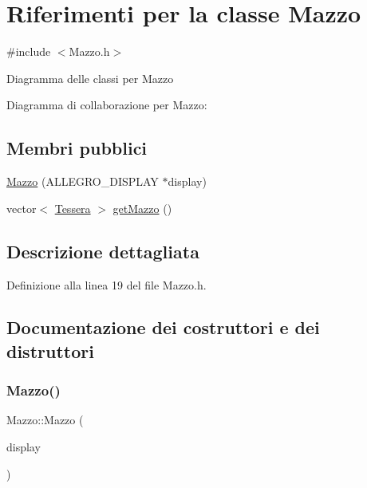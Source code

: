 \hypertarget{class_mazzo}{}\section{Riferimenti per la classe Mazzo}
\label{class_mazzo}


{\ttfamily \#include $<$Mazzo.\+h$>$}



Diagramma delle classi per Mazzo


Diagramma di collaborazione per Mazzo\+:
\subsection*{Membri pubblici}
\begin{DoxyCompactItemize}
\item 
\hyperlink{class_mazzo_a58deba0266bd34263db0c3cb3d15d3f3}{Mazzo} (A\+L\+L\+E\+G\+R\+O\+\_\+\+D\+I\+S\+P\+L\+AY $\ast$display)
\item 
vector$<$ \hyperlink{class_tessera}{Tessera} $>$ \hyperlink{class_mazzo_a891bc7fd96f2cfab2f5ba52ce8dd3c89}{get\+Mazzo} ()
\end{DoxyCompactItemize}


\subsection{Descrizione dettagliata}


Definizione alla linea 19 del file Mazzo.\+h.



\subsection{Documentazione dei costruttori e dei distruttori}
\mbox{\label{class_mazzo_a58deba0266bd34263db0c3cb3d15d3f3}} 
\subsubsection{\texorpdfstring{Mazzo()}{Mazzo()}}
{\footnotesize\ttfamily Mazzo\+::\+Mazzo (\begin{DoxyParamCaption}\item[{A\+L\+L\+E\+G\+R\+O\+\_\+\+D\+I\+S\+P\+L\+AY $\ast$}]{display }\end{DoxyParamCaption})\hspace{0.3cm}{\ttfamily [inline]}}



